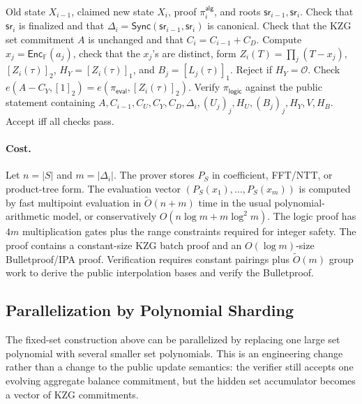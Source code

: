 \documentclass[runningheads]{llncs}
\newcommand{\F}{\mathbb{F}}
\newcommand{\Enc}{\mathsf{Enc}}
\newcommand{\sr}{\mathsf{sr}}
\newcommand{\Sync}{\mathsf{Sync}}
\newcommand{\softO}{\widetilde{O}}
\newcommand{\dlist}{\Delta}
\begin{document}
\begin{algorithm}[t]
\caption{Verifier for algebraic update}
\begin{algorithmic}[1]
\Require Old state \(X_{i-1}\), claimed new state \(X_i\), proof \(\pi_i^{\mathsf{alg}}\), and roots \(\sr_{i-1},\sr_i\).
\State Check that \(\sr_i\) is finalized and that \(\dlist_i=\Sync(\sr_{i-1},\sr_i)\) is canonical.
\State Check that the KZG set commitment \(A\) is unchanged and that \(C_i=C_{i-1}+C_D\).
\State Compute \(x_j=\Enc_{\F}(a_j)\), check that the \(x_j\)'s are distinct, form \(Z_i(T)=\prod_j(T-x_j)\), \([Z_i(\tau)]_2\), \(H_Y=[Z_i(\tau)]_1\), and \(B_j=[L_j(\tau)]_1\).
\State Reject if \(H_Y=\mathcal O\).  Check \(e(A-C_Y,[1]_2)=e(\pi_{\mathsf{eval}},[Z_i(\tau)]_2)\).
\State Verify \(\pi_{\mathsf{logic}}\) against the public statement containing \(A,C_{i-1},C_U,C_Y,C_D,\dlist_i,(U_j)_j,H_U,(B_j)_j,H_Y,V,H_B\).
\State Accept iff all checks pass.
\end{algorithmic}
\end{algorithm}

\paragraph{Cost.}
Let \(n=|S|\) and \(m=|\dlist_i|\).  The prover stores \(P_S\) in coefficient, FFT/NTT, or product-tree form.  The evaluation vector \((P_S(x_1),\ldots,P_S(x_m))\) is computed by fast multipoint evaluation in \(\softO(n+m)\) time in the usual polynomial-arithmetic model, or conservatively \(O(n\log m+m\log^2 m)\).  The logic proof has \(4m\) multiplication gates plus the range constraints required for integer safety.  The proof contains a constant-size KZG batch proof and an \(O(\log m)\)-size Bulletproof/IPA proof.  Verification requires constant pairings plus \(\softO(m)\) group work to derive the public interpolation bases and verify the Bulletproof.


\subsection{Parallelization by Polynomial Sharding}\label{sec:alg-parallel}

The fixed-set construction above can be parallelized by replacing one large set polynomial with several smaller set polynomials.  This is an engineering change rather than a change to the public update semantics: the verifier still accepts one evolving aggregate balance commitment, but the hidden set accumulator becomes a vector of KZG commitments.
\end{document}
